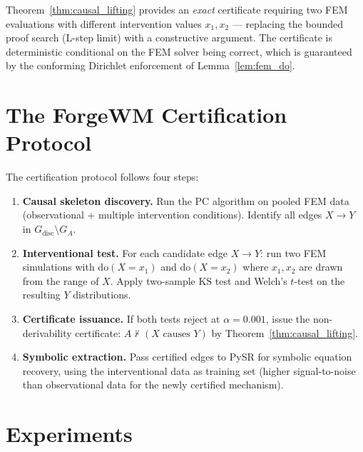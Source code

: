 \documentclass[twoside,11pt]{article}
\newcommand{\doOp}{\mathrm{do}}
\begin{document}
\begin{remark}
Theorem~\ref{thm:causal_lifting} provides an \emph{exact} certificate
requiring two FEM evaluations with different intervention values
$x_1, x_2$ --- replacing the bounded proof search (L-step limit) with
a constructive argument. The certificate is deterministic conditional
on the FEM solver being correct, which is guaranteed by the conforming
Dirichlet enforcement of Lemma~\ref{lem:fem_do}.
\end{remark}

\section{The ForgeWM Certification Protocol}
\label{sec:protocol}

The certification protocol follows four steps:

\begin{enumerate}[label=\textbf{S\arabic*.}]
\item \textbf{Causal skeleton discovery.} Run the PC algorithm on
  pooled FEM data (observational + multiple intervention conditions).
  Identify all edges $X \to Y$ in $G_{\mathrm{disc}} \setminus G_A$.

\item \textbf{Interventional test.} For each candidate edge
  $X \to Y$: run two FEM simulations with $\doOp(X{=}x_1)$ and
  $\doOp(X{=}x_2)$ where $x_1, x_2$ are drawn from the range of $X$.
  Apply two-sample KS test and Welch's $t$-test on the resulting
  $Y$ distributions.

\item \textbf{Certificate issuance.} If both tests reject at
  $\alpha = 0.001$, issue the non-derivability certificate:
  $A \nvdash (X \text{ causes } Y)$ by Theorem~\ref{thm:causal_lifting}.

\item \textbf{Symbolic extraction.} Pass certified edges to PySR
  for symbolic equation recovery, using the interventional data as
  training set (higher signal-to-noise than observational data for
  the newly certified mechanism).
\end{enumerate}

\section{Experiments}
\label{sec:experiments}
\end{document}
